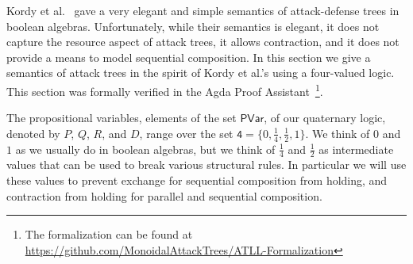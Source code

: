 \newcommand{\forth}{\frac{1}{4}}
\newcommand{\half}{\frac{1}{2}}

Kordy et al.~\cite{Kordy:2012} gave a very elegant and simple
semantics of attack-defense trees in boolean algebras.  Unfortunately,
while their semantics is elegant, it does not capture the resource
aspect of attack trees, it allows contraction, and it does not provide
a means to model sequential composition.  In this section we give a
semantics of attack trees in the spirit of Kordy et al.'s using a
four-valued logic.  This section was formally verified in the Agda
Proof Assistant~\cite{Norell:2009}\footnote{The formalization can be
  found at
  \url{https://github.com/MonoidalAttackTrees/ATLL-Formalization}}.

The propositional variables, elements of the set $\mathsf{PVar}$, of
our quaternary logic, denoted by $P$, $Q$, $R$, and $D$, range over
the set $\mathsf{4} = \{0, \forth, \half, 1\}$.  We think of $0$ and
$1$ as we usually do in boolean algebras, but we think of $\forth$ and
$\half$ as intermediate values that can be used to break various
structural rules.  In particular we will use these values to prevent
exchange for sequential composition from holding, and contraction from
holding for parallel and sequential composition.
